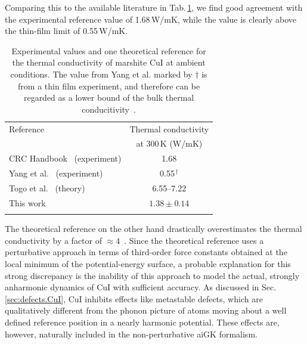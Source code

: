Comparing this to the available literature in Tab.\,\ref{tab:exp.CuI}, we find good agreement with the  experimental reference value of 1.68\,W/mK, while the value is clearly above the thin-film limit of 0.55\,W/mK.
\begin{table}[ht]
  \centering
  \selectfont
  \begin{tabular}{lc}
    \toprule
    Reference & Thermal conductivity \\
    & at 300\,K (W/mK) \\
    \midrule
    CRC Handbook~\cite{perry2016} (experiment) & 1.68 \\
    Yang et al.~\cite{yang2017} (experiment) &  0.55$^{\,\dagger}$ \\
    Togo et al.~\cite{phono3py} (theory) & 6.55--7.22 \\
    This work & $1.38 \pm 0.14$ \\
    \bottomrule
    \vspace{.5em}
  \end{tabular}
  \caption{Experimental values and one theoretical reference for the thermal conductivity of marshite CuI at ambient conditions. The value from Yang et al. marked by $\dagger$ is from a thin film experiment, and therefore can be regarded as a lower bound of the bulk thermal conducitivity~\cite{yang2017}.}
  \label{tab:exp.CuI}
\end{table}
The theoretical reference on the other hand drastically overestimates the thermal conductivity by a factor of $\approx 4$~\cite{phono3py}. Since the theoretical reference uses a perturbative approach in terms of third-order force constants obtained at the local minimum of the potential-energy surface, a probable explanation for this strong discrepancy is the inability of this approach to model the actual, strongly anharmonic dynamics of CuI with sufficient accuracy. As discussed in Sec.\,\ref{sec:defects.CuI}, CuI inhibits effects like metastable defects, which are qualitatively different from the phonon picture of atoms moving about a well defined reference position in a nearly harmonic potential. These effects are, however, naturally included in the non-perturbative aiGK formalism.


